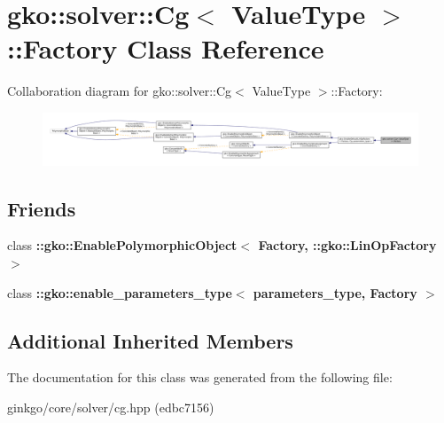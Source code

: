 \hypertarget{classgko_1_1solver_1_1Cg_1_1Factory}{}\section{gko\+:\+:solver\+:\+:Cg$<$ Value\+Type $>$\+:\+:Factory Class Reference}
\label{classgko_1_1solver_1_1Cg_1_1Factory}


Collaboration diagram for gko\+:\+:solver\+:\+:Cg$<$ Value\+Type $>$\+:\+:Factory\+:
\nopagebreak
\begin{figure}[H]
\begin{center}
\leavevmode
\includegraphics[width=350pt]{classgko_1_1solver_1_1Cg_1_1Factory__coll__graph}
\end{center}
\end{figure}
\subsection*{Friends}
\begin{DoxyCompactItemize}
\item 
\mbox{\label{classgko_1_1solver_1_1Cg_1_1Factory_a27e9bbc94a1c1c59f40833153eda8f78}} 
class {\bfseries \+::gko\+::\+Enable\+Polymorphic\+Object$<$ Factory, \+::gko\+::\+Lin\+Op\+Factory $>$}
\item 
\mbox{\label{classgko_1_1solver_1_1Cg_1_1Factory_a0d176cbd42d6214e11aee8c30ca256fc}} 
class {\bfseries \+::gko\+::enable\+\_\+parameters\+\_\+type$<$ parameters\+\_\+type, Factory $>$}
\end{DoxyCompactItemize}
\subsection*{Additional Inherited Members}


The documentation for this class was generated from the following file\+:\begin{DoxyCompactItemize}
\item 
ginkgo/core/solver/cg.\+hpp (edbc7156)\end{DoxyCompactItemize}
